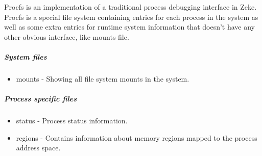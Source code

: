 Procfs is an implementation of a traditional process debugging interface in
Zeke. Procfs is a special file system containing entries for each process
in the system as well as some extra entries for runtime system information that
doesn't have any other obvious interface, like mounts file.

\subparagraph{System files}
\begin{itemize}
    \item mounts    - Showing all file system mounts in the system.
\end{itemize}

\subparagraph{Process specific files}
\begin{itemize}
    \item status    - Process status information.
    \item regions   - Contains information about memory regions mapped to
                      the process address space.
\end{itemize}
